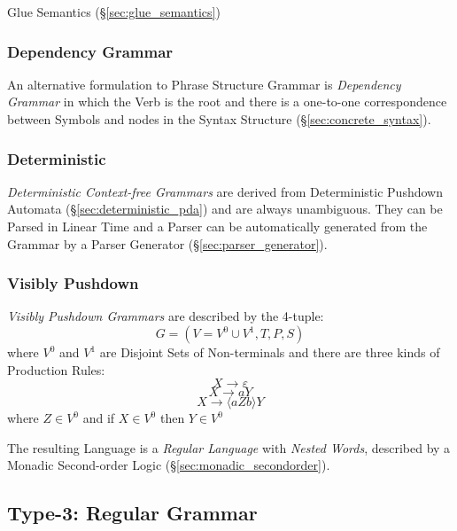 Glue Semantics (\S\ref{sec:glue_semantics})



\subsubsection{Dependency Grammar}\label{sec:dependency_grammar}

An alternative formulation to Phrase Structure Grammar is \emph{Dependency
  Grammar} in which the Verb is the root and there is a one-to-one
correspondence between Symbols and nodes in the Syntax Structure
(\S\ref{sec:concrete_syntax}).



\subsubsection{Deterministic}\label{sec:deterministic_cfg}

\emph{Deterministic Context-free Grammars} are derived from Deterministic
Pushdown Automata (\S\ref{sec:deterministic_pda}) and are always unambiguous.
They can be Parsed in Linear Time and a Parser can be automatically generated
from the Grammar by a Parser Generator (\S\ref{sec:parser_generator}).



\subsubsection{Visibly Pushdown}\label{sec:visibly_pushdown}

\emph{Visibly Pushdown Grammars} are described by the 4-tuple:
\[
  G = (V=V^0 \cup V^1,T,P,S)
\]
where $V^0$ and $V^1$ are Disjoint Sets of Non-terminals and there are three
kinds of Production Rules:
\[
  X \rightarrow \varepsilon
\]\[
  X \rightarrow aY
\]\[
  X \rightarrow \langle aZb \rangle Y
\]
where $Z \in V^0$ and if $X \in V^0$ then $Y \in V^0$

The resulting Language is a \emph{Regular Language} with \emph{Nested Words},
described by a Monadic Second-order Logic (\S\ref{sec:monadic_secondorder}).



\subsection{Type-3: Regular Grammar} \label{sec:regular_language}


